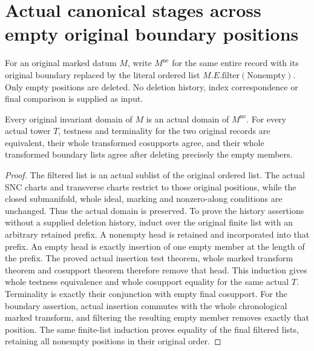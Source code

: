 \section{Actual canonical stages across empty original boundary positions}

For an original marked datum $M$, write $M^{\mathrm{ne}}$ for the same
entire record with its original boundary replaced by the literal ordered
list $M.E.\mathrm{filter}(\mathrm{Nonempty})$. Only empty positions are
deleted. No deletion history, index correspondence or final comparison
is supplied as input.

\begin{lemma}
\label{hir:original-boundary-empty-filter-geometry}
\leanok
Every original invariant domain of $M$ is an actual domain of
$M^{\mathrm{ne}}$. For every actual tower $T$, testness and terminality
for the two original records are equivalent, their whole transformed
cosupports agree, and their whole transformed boundary lists agree after
deleting precisely the empty members.
\end{lemma}
\begin{proof}
The filtered list is an actual sublist of the original ordered list.
The actual SNC charts and transverse charts restrict to those original
positions, while the closed submanifold, whole ideal, marking and
nonzero-along conditions are unchanged. Thus the actual domain is
preserved. To prove the history assertions without a supplied deletion
history, induct over the original finite list with an arbitrary retained
prefix. A nonempty head is retained and incorporated into that prefix.
An empty head is exactly insertion of one empty member at the length of
the prefix. The proved actual insertion test theorem, whole marked
transform theorem and cosupport theorem therefore remove that head.
This induction gives whole testness equivalence and whole cosupport
equality for the same actual $T$. Terminality is exactly their conjunction
with empty final cosupport. For the boundary assertion, actual insertion
commutes with the whole chronological marked transform, and filtering
the resulting empty member removes exactly that position. The same
finite-list induction proves equality of the final filtered lists,
retaining all nonempty positions in their original order.
\end{proof}


